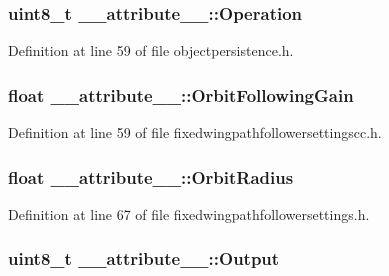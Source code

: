 \hypertarget{struct____attribute_____a15c277558e77fa3ec8d53de0b3df3268}{
\subsubsection[{\-Operation}]{\setlength{\rightskip}{0pt plus 5cm}uint8\-\_\-t {\bf \-\_\-\-\_\-attribute\-\_\-\-\_\-\-::\-Operation}}}\label{struct____attribute_____a15c277558e77fa3ec8d53de0b3df3268}


\-Definition at line 59 of file objectpersistence.\-h.

\hypertarget{struct____attribute_____a58a226ce647941db9f8dcbefe7c8fa71}{
\subsubsection[{\-Orbit\-Following\-Gain}]{\setlength{\rightskip}{0pt plus 5cm}float {\bf \-\_\-\-\_\-attribute\-\_\-\-\_\-\-::\-Orbit\-Following\-Gain}}}\label{struct____attribute_____a58a226ce647941db9f8dcbefe7c8fa71}


\-Definition at line 59 of file fixedwingpathfollowersettingscc.\-h.

\hypertarget{struct____attribute_____a675a4557be1b35e6beab5eddc925bd2d}{
\subsubsection[{\-Orbit\-Radius}]{\setlength{\rightskip}{0pt plus 5cm}float {\bf \-\_\-\-\_\-attribute\-\_\-\-\_\-\-::\-Orbit\-Radius}}}\label{struct____attribute_____a675a4557be1b35e6beab5eddc925bd2d}


\-Definition at line 67 of file fixedwingpathfollowersettings.\-h.

\hypertarget{struct____attribute_____a9b550253a1fe2025d54d2ef5f7efcbca}{
\subsubsection[{\-Output}]{\setlength{\rightskip}{0pt plus 5cm}uint8\-\_\-t {\bf \-\_\-\-\_\-attribute\-\_\-\-\_\-\-::\-Output}}}\label{struct____attribute_____a9b550253a1fe2025d54d2ef5f7efcbca}


